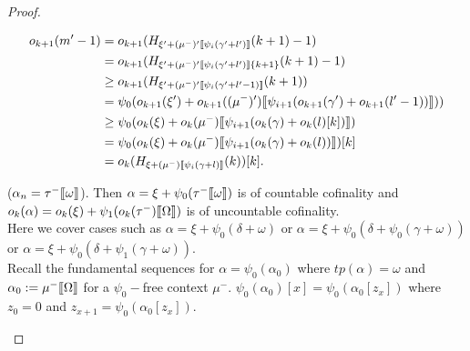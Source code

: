 \documentclass{amsart}
\theoremstyle{plain}
\theoremstyle{plain}
\def\scbrl{[\hspace{-.14em}[}
\def\scbrr{]\hspace{-.14em}]}
\def\scbr#1{\scbrl#1\scbrr}
\newcommand{\Om}{{\Omega}}
\newcommand{\okpe}{o_{k+1}}
\newcommand{\ok}{o_{k}}
\newcommand{\al}{{\alpha}}
\newcommand{\ga}{\gamma}
\newcommand{\de}{\delta}
\newcommand{\la}{\lambda}
\newcommand{\om}{\omega}
\def\scbrl{[\hspace{-.14em}[}
\def\scbrr{]\hspace{-.14em}]}
\def\scbr#1{\scbrl#1\scbrr}
\begin{document}
\begin{proof}
\begin{Cases}
\begin{Cases}
\begin{Cases}
            \begin{align*} 
                \okpe(m'-1) & =\okpe(H_{\xi'+(\mu^-)'\scbr{\psi_i(\ga'+l')}}(k+1) - 1)\\
                & = \okpe(H_{\xi'+(\mu^-)'\scbr{\psi_i(\ga'+l')}\{k+1\}}(k+1)-1)\\
                & \geq \okpe(H_{\xi'+(\mu^-)'\scbr{\psi_i(\ga'+l'-1)}}(k+1))\\
                & = \psi_0(\okpe(\xi')+ \okpe((\mu^-)')\scbr{\psi_{i+1}(\okpe(\ga')+\okpe(l'-1))}))\\
                & \geq \psi_0( \ok(\xi)+ \ok(\mu^-)\scbr{\psi_{i+1}(\ok(\ga)+\ok(l)[k])})\\
                & = \psi_0(\ok(\xi)+ \ok(\mu^-)\scbr{\psi_{i+1}(\ok(\ga)+\ok(l))})[k]\\
                &=\ok(H_{\xi+ (\mu^-)\scbr{\psi_i(\ga+l)}}(k))[k].\\
            \end{align*}
            
            
            
            \item ($\al_n=\tau^-\scbr{\om}$).\label{CaseCountCof}
            Then $\al= \xi + \psi_0(\tau^-\scbr{\om})$ is of countable cofinality and
            $\ok(\al)= \ok(\xi) + \psi_1(\ok(\tau^-)\scbr{\Om})$ is of uncountable cofinality.\medskip
            \\
            Here we  cover cases such as  $\al = \xi + \psi_0(\de + \om)$ or $\al = \xi + \psi_0(\de+ \psi_0(\ga +\om))$  or $\al = \xi + \psi_0(\de+ \psi_1(\ga +\om))$. \\	    
            Recall the fundamental sequences for $\al = \psi_0(\al_0)$ where $tp(\al)=\om$ and $\al_0 :=\mu^-\scbr{\Om}$ for a $\psi_0-$free context $\mu^-$.
            $\psi_0(\al_0)[x] = \psi_0(\al_0[z_x])$ where $z_0=0$ and $z_{x+1}= \psi_0(\al_0[z_x])$.\medskip
            

\end{Cases}
\end{Cases}
\end{Cases}
\end{proof}
\end{document}
